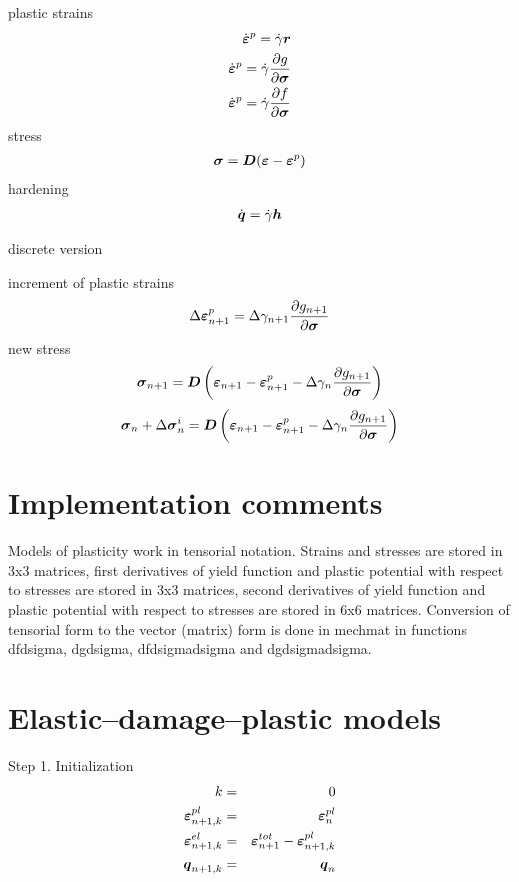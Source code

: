 plastic strains
\begin{eqnarray}
\dot{\mbox{\boldmath$\varepsilon$}}^p = \dot{\gamma} \mbox{\boldmath$r$}
\\
\dot{\mbox{\boldmath$\varepsilon$}}^p = \dot{\gamma} \mbox{$\displaystyle\frac{\partial{g}}{\partial{\mbox{\boldmath$\sigma$}}}$}
\\
\dot{\mbox{\boldmath$\varepsilon$}}^p = \dot{\gamma} \mbox{$\displaystyle\frac{\partial{f}}{\partial{\mbox{\boldmath$\sigma$}}}$}
\end{eqnarray}
stress
\begin{eqnarray}
\mbox{\boldmath$\sigma$} = \mbox{\boldmath$D$} (\mbox{\boldmath$\varepsilon$} - \mbox{\boldmath$\varepsilon$}^p)
\end{eqnarray}
hardening
\begin{eqnarray}
\dot{\mbox{\boldmath$q$}} = \dot{\gamma} \mbox{\boldmath$h$}
\end{eqnarray}

discrete version

increment of plastic strains
\begin{eqnarray}
\Delta \mbox{\boldmath$\varepsilon$}^p_{n+1} = \Delta \gamma_{n+1} \mbox{$\displaystyle\frac{\partial{g_{n+1}}}{\partial{\mbox{\boldmath$\sigma$}}}$}
\end{eqnarray}
new stress
\begin{eqnarray}
\mbox{\boldmath$\sigma$}_{n+1} = \mbox{\boldmath$D$} \left(\mbox{\boldmath$\varepsilon$}_{n+1} - \mbox{\boldmath$\varepsilon$}^p_{n+1} - \Delta \gamma_{n} \mbox{$\displaystyle\frac{\partial{g_{n+1}}}{\partial{\mbox{\boldmath$\sigma$}}}$}\right)
\end{eqnarray}
\begin{eqnarray}
\mbox{\boldmath$\sigma$}_{n} + \Delta \mbox{\boldmath$\sigma$}_{n}^i = \mbox{\boldmath$D$} \left(\mbox{\boldmath$\varepsilon$}_{n+1} - \mbox{\boldmath$\varepsilon$}^p_{n+1} -
\Delta \gamma_{n} \mbox{$\displaystyle\frac{\partial{g_{n+1}}}{\partial{\mbox{\boldmath$\sigma$}}}$}\right)
\end{eqnarray}


\section{Implementation comments}
Models of plasticity work in tensorial notation. Strains and stresses
are stored in 3x3 matrices, first derivatives of yield function and
plastic potential with respect to stresses are stored in 3x3
matrices, second derivatives of yield function and plastic potential
with respect to stresses are stored in 6x6 matrices. Conversion
of tensorial form to the vector (matrix) form is done in mechmat
in functions dfdsigma, dgdsigma, dfdsigmadsigma and dgdsigmadsigma.

\section{Elastic--damage--plastic models}

Step 1. Initialization
\begin{eqnarray}
k&=&0
\\
\mbox{\boldmath$\varepsilon$}_{n+1,k}^{pl} &=& \mbox{\boldmath$\varepsilon$}_n^{pl}
\\
\mbox{\boldmath$\varepsilon$}_{n+1,k}^{el} &=& \mbox{\boldmath$\varepsilon$}_{n+1}^{tot} - \mbox{\boldmath$\varepsilon$}_{n+1,k}^{pl}
\\
\mbox{\boldmath$q$}_{n+1,k} &=& \mbox{\boldmath$q$}_n
\end{eqnarray}

